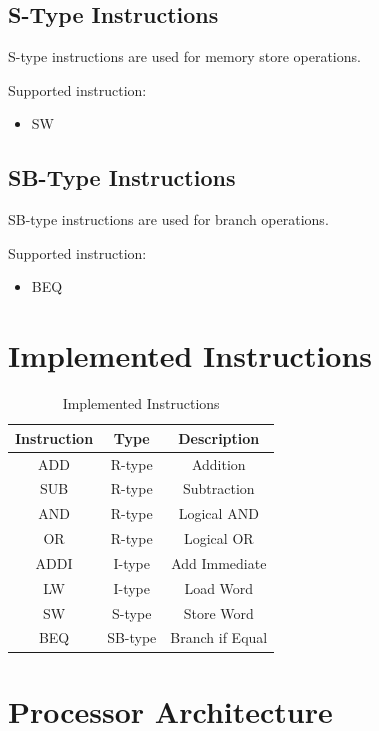 \documentclass[conference]{IEEEtran}
\begin{document}
\subsection{S-Type Instructions}

S-type instructions are used for memory store operations.

Supported instruction:

\begin{itemize}
    \item SW
\end{itemize}

\subsection{SB-Type Instructions}

SB-type instructions are used for branch operations.

Supported instruction:

\begin{itemize}
    \item BEQ
\end{itemize}


\section{Implemented Instructions}

\begin{table}[H]
\caption{Implemented Instructions}
\centering
\begin{tabular}{|c|c|c|}
\hline
Instruction & Type & Description \\
\hline
ADD & R-type & Addition \\
SUB & R-type & Subtraction \\
AND & R-type & Logical AND \\
OR & R-type & Logical OR \\
ADDI & I-type & Add Immediate \\
LW & I-type & Load Word \\
SW & S-type & Store Word \\
BEQ & SB-type & Branch if Equal \\
\hline
\end{tabular}
\end{table}


\section{Processor Architecture}
\end{document}
